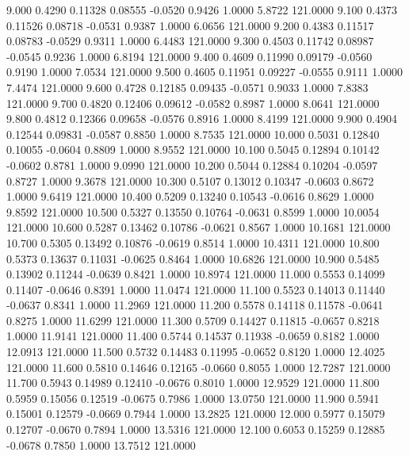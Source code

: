    9.000   0.4290   0.11328   0.08555  -0.0520   0.9426   1.0000   5.8722 121.0000
   9.100   0.4373   0.11526   0.08718  -0.0531   0.9387   1.0000   6.0656 121.0000
   9.200   0.4383   0.11517   0.08783  -0.0529   0.9311   1.0000   6.4483 121.0000
   9.300   0.4503   0.11742   0.08987  -0.0545   0.9236   1.0000   6.8194 121.0000
   9.400   0.4609   0.11990   0.09179  -0.0560   0.9190   1.0000   7.0534 121.0000
   9.500   0.4605   0.11951   0.09227  -0.0555   0.9111   1.0000   7.4474 121.0000
   9.600   0.4728   0.12185   0.09435  -0.0571   0.9033   1.0000   7.8383 121.0000
   9.700   0.4820   0.12406   0.09612  -0.0582   0.8987   1.0000   8.0641 121.0000
   9.800   0.4812   0.12366   0.09658  -0.0576   0.8916   1.0000   8.4199 121.0000
   9.900   0.4904   0.12544   0.09831  -0.0587   0.8850   1.0000   8.7535 121.0000
  10.000   0.5031   0.12840   0.10055  -0.0604   0.8809   1.0000   8.9552 121.0000
  10.100   0.5045   0.12894   0.10142  -0.0602   0.8781   1.0000   9.0990 121.0000
  10.200   0.5044   0.12884   0.10204  -0.0597   0.8727   1.0000   9.3678 121.0000
  10.300   0.5107   0.13012   0.10347  -0.0603   0.8672   1.0000   9.6419 121.0000
  10.400   0.5209   0.13240   0.10543  -0.0616   0.8629   1.0000   9.8592 121.0000
  10.500   0.5327   0.13550   0.10764  -0.0631   0.8599   1.0000  10.0054 121.0000
  10.600   0.5287   0.13462   0.10786  -0.0621   0.8567   1.0000  10.1681 121.0000
  10.700   0.5305   0.13492   0.10876  -0.0619   0.8514   1.0000  10.4311 121.0000
  10.800   0.5373   0.13637   0.11031  -0.0625   0.8464   1.0000  10.6826 121.0000
  10.900   0.5485   0.13902   0.11244  -0.0639   0.8421   1.0000  10.8974 121.0000
  11.000   0.5553   0.14099   0.11407  -0.0646   0.8391   1.0000  11.0474 121.0000
  11.100   0.5523   0.14013   0.11440  -0.0637   0.8341   1.0000  11.2969 121.0000
  11.200   0.5578   0.14118   0.11578  -0.0641   0.8275   1.0000  11.6299 121.0000
  11.300   0.5709   0.14427   0.11815  -0.0657   0.8218   1.0000  11.9141 121.0000
  11.400   0.5744   0.14537   0.11938  -0.0659   0.8182   1.0000  12.0913 121.0000
  11.500   0.5732   0.14483   0.11995  -0.0652   0.8120   1.0000  12.4025 121.0000
  11.600   0.5810   0.14646   0.12165  -0.0660   0.8055   1.0000  12.7287 121.0000
  11.700   0.5943   0.14989   0.12410  -0.0676   0.8010   1.0000  12.9529 121.0000
  11.800   0.5959   0.15056   0.12519  -0.0675   0.7986   1.0000  13.0750 121.0000
  11.900   0.5941   0.15001   0.12579  -0.0669   0.7944   1.0000  13.2825 121.0000
  12.000   0.5977   0.15079   0.12707  -0.0670   0.7894   1.0000  13.5316 121.0000
  12.100   0.6053   0.15259   0.12885  -0.0678   0.7850   1.0000  13.7512 121.0000
